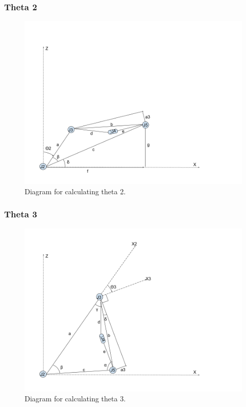 \documentclass{article}
\begin{document}
\subsubsection{Theta 2}
\begin{figure}[H]
    \includegraphics[width=\linewidth]{theta2.png}
    \caption{Diagram for calculating theta 2.}
    \label{fig:theta3}
\end{figure}

\subsubsection{Theta 3}
\begin{figure}[H]
    \includegraphics[width=\linewidth]{theta3.png}
    \caption{Diagram for calculating theta 3.}
    \label{fig:theta3}
\end{figure}
\end{document}
